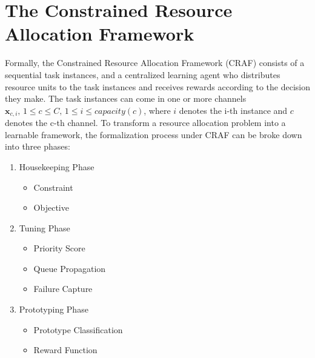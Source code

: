 \documentclass[conference]{IEEEtran}
\begin{document}
\section{The Constrained Resource Allocation Framework}

Formally, the Constrained Resource Allocation Framework (CRAF) consists of a sequential task instances, and a centralized learning agent who distributes resource units to the task instances and receives rewards according to the decision they make. The task instances can come in one or more channels $\mathbf{x}_{c,i},\, 1\leq c \leq C,\, 1\leq i \leq capacity(c)$, where $i$ denotes the i-th instance and $c$ denotes the c-th channel. To transform a resource allocation problem into a learnable framework, the formalization process under CRAF can be broke down into three phases:

\begin{enumerate}
	\item Housekeeping Phase
	\begin{itemize}
		\item Constraint
		\item Objective
	\end{itemize}
	\item Tuning Phase
	\begin{itemize}
		\item Priority Score
		\item Queue Propagation
		\item Failure Capture
	\end{itemize}
	\item Prototyping Phase
	\begin{itemize}
		\item Prototype Classification
		\item Reward Function
	\end{itemize}
\end{enumerate}

\newpage

%
%
%
%
%


\end{document}

